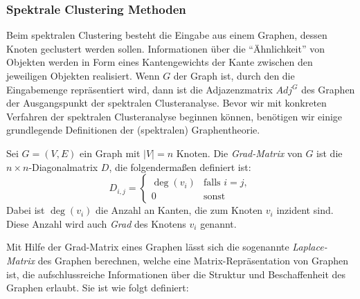 \subsubsection{Spektrale Clustering Methoden}

Beim spektralen Clustering besteht die Eingabe aus einem Graphen, dessen Knoten geclustert werden sollen. Informationen
über die "`Ähnlichkeit"' von Objekten werden in Form eines Kantengewichts der Kante zwischen den jeweiligen Objekten
realisiert. Wenn $G$ der Graph ist, durch den die Eingabemenge repräsentiert wird, dann ist die Adjazenzmatrix $Adj^G$ des
Graphen der Ausgangspunkt der spektralen Clusteranalyse. Bevor wir mit konkreten Verfahren der spektralen Clusteranalyse
beginnen können, benötigen wir einige grundlegende Definitionen der (spektralen) Graphentheorie.

\begin{definition}
\label{def:degree-matrix}
	Sei $G = (V,E)$ ein Graph mit $\left| V \right| = n$ Knoten. Die \emph{Grad-Matrix} von $G$ ist die
	$n \times n$-Diagonalmatrix $D$, die folgendermaßen definiert ist:
	\[ D_{i,j} = 	\begin{cases}
						\deg(v_i) & \textrm{falls } i = j, \\
						0 & \textrm{sonst}
					\end{cases}
	\]
	Dabei ist $\deg(v_i)$ die Anzahl an Kanten, die zum Knoten $v_i$ inzident sind. Diese Anzahl wird auch
	\emph{Grad} des Knotens $v_i$ genannt.
\end{definition}

Mit Hilfe der Grad-Matrix eines Graphen lässt sich die sogenannte \emph{Laplace-Matrix} des Graphen berechnen, welche eine
Matrix-Repräsentation von Graphen ist, die aufschlussreiche Informationen über die Struktur und Beschaffenheit des Graphen
erlaubt. Sie ist wie folgt definiert:


